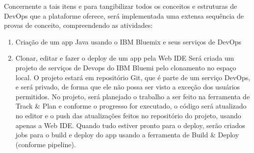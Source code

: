 Concernente a tais itens e para tangibilizar todos os conceitos e estruturas de DevOps que a plataforme oferece, será implementada uma extensa sequência de provas de conceito, compreendendo as atividades:
\begin{enumerate}
    \item Criação de um app Java usando o IBM Bluemix e seus serviços de DevOps
    \item Clonar, editar e fazer o deploy de um app pela Web IDE
    Será criada um projeto de serviços de Devops do IBM Bluemi pelo
    clonamento no espaço local. O projeto estará em repositório Git,
    que é parte de um serviço DevOps, e será privado, de forma que
    ele não possa ser visto a exceção dos usuários permitidos. No
    projeto, será planejado o trabalho a ser feito na ferramenta de
    Track & Plan e conforme o progresso for executado, o código será 
    atualizado no editor e o push das atualizações feitos no
    repositório do projeto, usando apenas a Web IDE.
    Quando tudo estiver pronto para o deploy, serão criados jobs
    para o build e deploy do app usando a ferramenta de Build \& Deploy
    (conforme pipeline).


\end{enumerate}
